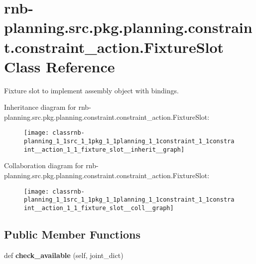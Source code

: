 \hypertarget{classrnb-planning_1_1src_1_1pkg_1_1planning_1_1constraint_1_1constraint__action_1_1_fixture_slot}{}\section{rnb-\/planning.src.\+pkg.\+planning.\+constraint.\+constraint\+\_\+action.\+Fixture\+Slot Class Reference}
\label{classrnb-planning_1_1src_1_1pkg_1_1planning_1_1constraint_1_1constraint__action_1_1_fixture_slot}


Fixture slot to implement assembly object with bindings.  




Inheritance diagram for rnb-\/planning.src.\+pkg.\+planning.\+constraint.\+constraint\+\_\+action.\+Fixture\+Slot\+:\nopagebreak
\begin{figure}[H]
\begin{center}
\leavevmode
\texttt{[image: classrnb-planning\_1\_1src\_1\_1pkg\_1\_1planning\_1\_1constraint\_1\_1constraint\_\_action\_1\_1\_fixture\_slot\_\_inherit\_\_graph]}
\end{center}
\end{figure}


Collaboration diagram for rnb-\/planning.src.\+pkg.\+planning.\+constraint.\+constraint\+\_\+action.\+Fixture\+Slot\+:\nopagebreak
\begin{figure}[H]
\begin{center}
\leavevmode
\texttt{[image: classrnb-planning\_1\_1src\_1\_1pkg\_1\_1planning\_1\_1constraint\_1\_1constraint\_\_action\_1\_1\_fixture\_slot\_\_coll\_\_graph]}
\end{center}
\end{figure}
\subsection*{Public Member Functions}
\begin{DoxyCompactItemize}
\item 
\mbox{\label{classrnb-planning_1_1src_1_1pkg_1_1planning_1_1constraint_1_1constraint__action_1_1_fixture_slot_a4151315335488fc80d13c1676df71c07}} 
def {\bfseries check\+\_\+available} (self, joint\+\_\+dict)
\end{DoxyCompactItemize}
